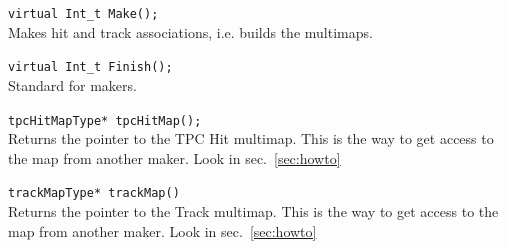 \begin{Entry}
    \verb+virtual Int_t Make();+\\
    Makes hit and track associations, i.e. builds the multimaps.

    \verb+virtual Int_t Finish();+\\
    Standard for makers.

    \verb+tpcHitMapType* tpcHitMap();+\\
    Returns the pointer to the TPC Hit multimap.  This is the way to get access to
    the map from another maker.  Look in sec.~\ref{sec:howto}

    \verb+trackMapType* trackMap()+\\
    Returns the pointer to the Track multimap.  This is the way to get access to
    the map from another maker.  Look in sec.~\ref{sec:howto}

\end{Entry}

%
%

